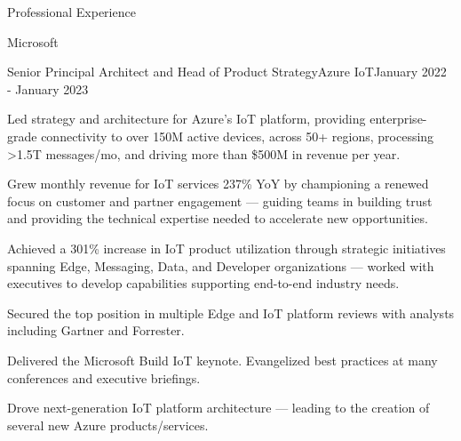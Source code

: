 \documentclass{resume} %
\begin{document}
\begin{rSection}{Professional Experience}
  \begin{rCompany}{Microsoft}{}{}

     \begin{rSubSubsection}{Senior Principal Architect and Head of Product Strategy}{Azure IoT}{January 2022 - January 2023}
        \item Led strategy and architecture for Azure's IoT platform, providing enterprise-grade connectivity to over 150M active devices, across 50+ regions, processing >1.5T messages/mo, and driving more than \$500M in revenue per year.
        \item Grew monthly revenue for IoT services 237\% YoY by championing a renewed focus on customer and partner engagement --- guiding teams in building trust and providing the technical expertise needed to accelerate new opportunities.
        \item Achieved a 301\% increase in IoT product utilization through strategic initiatives spanning Edge, Messaging, Data, and Developer organizations --- worked with executives to develop capabilities supporting end-to-end industry needs.
        \item Secured the top position in multiple Edge and IoT platform reviews with analysts including Gartner and Forrester.
        \item Delivered the Microsoft Build IoT keynote. Evangelized best practices at many conferences and executive briefings.
        \item Drove next-generation IoT platform architecture --- leading to the creation of several new Azure products/services.
    
    \end{rSubSubsection}
    

\end{rCompany}
\end{rSection}
\end{document}
